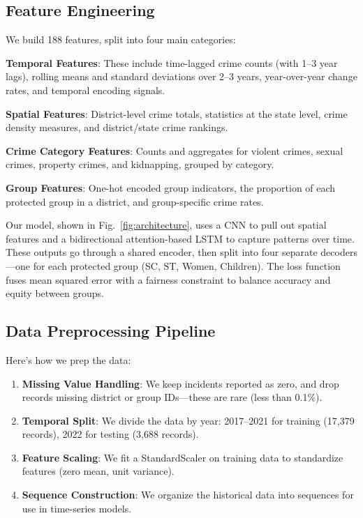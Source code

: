 \documentclass[conference]{IEEEtran}
\begin{document}
\subsection{Feature Engineering}

We build 188 features, split into four main categories:

\textbf{Temporal Features}: These include time-lagged crime counts (with 1--3 year lags), rolling means and standard deviations over 2--3 years, year-over-year change rates, and temporal encoding signals.

\textbf{Spatial Features}: District-level crime totals, statistics at the state level, crime density measures, and district/state crime rankings.

\textbf{Crime Category Features}: Counts and aggregates for violent crimes, sexual crimes, property crimes, and kidnapping, grouped by category.

\textbf{Group Features}: One-hot encoded group indicators, the proportion of each protected group in a district, and group-specific crime rates.

Our model, shown in Fig.~\ref{fig:architecture}, uses a CNN to pull out spatial features and a bidirectional attention-based LSTM to capture patterns over time. These outputs go through a shared encoder, then split into four separate decoders---one for each protected group (SC, ST, Women, Children). The loss function fuses mean squared error with a fairness constraint to balance accuracy and equity between groups.

\subsection{Data Preprocessing Pipeline}

Here's how we prep the data:

\begin{enumerate}
    \item \textbf{Missing Value Handling}: We keep incidents reported as zero, and drop records missing district or group IDs---these are rare (less than 0.1\%).
    \item \textbf{Temporal Split}: We divide the data by year: 2017--2021 for training (17,379 records), 2022 for testing (3,688 records).
    \item \textbf{Feature Scaling}: We fit a StandardScaler on training data to standardize features (zero mean, unit variance).
    \item \textbf{Sequence Construction}: We organize the historical data into sequences for use in time-series models.
\end{enumerate}
\end{document}
